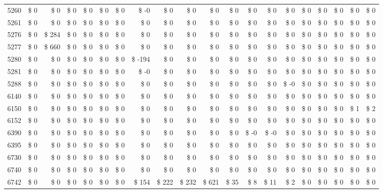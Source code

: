\begin{longtable}{lrrrrrrrrrrrrrrrrrrr}
5260 & \$ 0 & \$ 0 & \$ 0 & \$ 0 & \$ 0 & \$ 0 & \$ -0 & \$ 0 & \$ 0 & \$ 0 & \$ 0 & \$ 0 & \$ 0 & \$ 0 & \$ 0 & \$ 0 & \$ 0 & \$ 0 & \$ 0 \\
5261 & \$ 0 & \$ 0 & \$ 0 & \$ 0 & \$ 0 & \$ 0 & \$ 0 & \$ 0 & \$ 0 & \$ 0 & \$ 0 & \$ 0 & \$ 0 & \$ 0 & \$ 0 & \$ 0 & \$ 0 & \$ 0 & \$ 0 \\
5276 & \$ 0 & \$ 284 & \$ 0 & \$ 0 & \$ 0 & \$ 0 & \$ 0 & \$ 0 & \$ 0 & \$ 0 & \$ 0 & \$ 0 & \$ 0 & \$ 0 & \$ 0 & \$ 0 & \$ 0 & \$ 0 & \$ 0 \\
5277 & \$ 0 & \$ 660 & \$ 0 & \$ 0 & \$ 0 & \$ 0 & \$ 0 & \$ 0 & \$ 0 & \$ 0 & \$ 0 & \$ 0 & \$ 0 & \$ 0 & \$ 0 & \$ 0 & \$ 0 & \$ 0 & \$ 0 \\
5280 & \$ 0 & \$ 0 & \$ 0 & \$ 0 & \$ 0 & \$ 0 & \$ -194 & \$ 0 & \$ 0 & \$ 0 & \$ 0 & \$ 0 & \$ 0 & \$ 0 & \$ 0 & \$ 0 & \$ 0 & \$ 0 & \$ 0 \\
5281 & \$ 0 & \$ 0 & \$ 0 & \$ 0 & \$ 0 & \$ 0 & \$ -0 & \$ 0 & \$ 0 & \$ 0 & \$ 0 & \$ 0 & \$ 0 & \$ 0 & \$ 0 & \$ 0 & \$ 0 & \$ 0 & \$ 0 \\
5288 & \$ 0 & \$ 0 & \$ 0 & \$ 0 & \$ 0 & \$ 0 & \$ 0 & \$ 0 & \$ 0 & \$ 0 & \$ 0 & \$ 0 & \$ 0 & \$ -0 & \$ 0 & \$ 0 & \$ 0 & \$ 0 & \$ 0 \\
6140 & \$ 0 & \$ 0 & \$ 0 & \$ 0 & \$ 0 & \$ 0 & \$ 0 & \$ 0 & \$ 0 & \$ 0 & \$ 0 & \$ 0 & \$ 0 & \$ 0 & \$ 0 & \$ 0 & \$ 0 & \$ 0 & \$ 0 \\
6150 & \$ 0 & \$ 0 & \$ 0 & \$ 0 & \$ 0 & \$ 0 & \$ 0 & \$ 0 & \$ 0 & \$ 0 & \$ 0 & \$ 0 & \$ 0 & \$ 0 & \$ 0 & \$ 0 & \$ 0 & \$ 1 & \$ 2 \\
6152 & \$ 0 & \$ 0 & \$ 0 & \$ 0 & \$ 0 & \$ 0 & \$ 0 & \$ 0 & \$ 0 & \$ 0 & \$ 0 & \$ 0 & \$ 0 & \$ 0 & \$ 0 & \$ 0 & \$ 0 & \$ 0 & \$ 0 \\
6390 & \$ 0 & \$ 0 & \$ 0 & \$ 0 & \$ 0 & \$ 0 & \$ 0 & \$ 0 & \$ 0 & \$ 0 & \$ 0 & \$ -0 & \$ -0 & \$ 0 & \$ 0 & \$ 0 & \$ 0 & \$ 0 & \$ 0 \\
6395 & \$ 0 & \$ 0 & \$ 0 & \$ 0 & \$ 0 & \$ 0 & \$ 0 & \$ 0 & \$ 0 & \$ 0 & \$ 0 & \$ 0 & \$ 0 & \$ 0 & \$ 0 & \$ 0 & \$ 0 & \$ 0 & \$ 0 \\
6730 & \$ 0 & \$ 0 & \$ 0 & \$ 0 & \$ 0 & \$ 0 & \$ 0 & \$ 0 & \$ 0 & \$ 0 & \$ 0 & \$ 0 & \$ 0 & \$ 0 & \$ 0 & \$ 0 & \$ 0 & \$ 0 & \$ 0 \\
6740 & \$ 0 & \$ 0 & \$ 0 & \$ 0 & \$ 0 & \$ 0 & \$ 0 & \$ 0 & \$ 0 & \$ 0 & \$ 0 & \$ 0 & \$ 0 & \$ 0 & \$ 0 & \$ 0 & \$ 0 & \$ 0 & \$ 0 \\
6742 & \$ 0 & \$ 0 & \$ 0 & \$ 0 & \$ 0 & \$ 0 & \$ 154 & \$ 222 & \$ 232 & \$ 621 & \$ 35 & \$ 8 & \$ 11 & \$ 2 & \$ 0 & \$ 0 & \$ 0 & \$ 0 & \$ 0 \\

\end{longtable}
